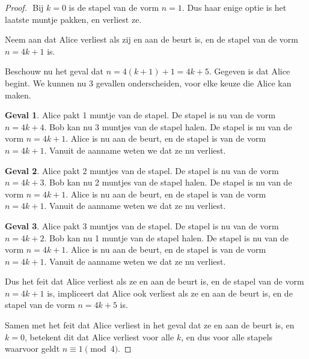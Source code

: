 \documentclass[12pt, dutch, a4paper]{article}
\theoremstyle{definition}
\newtheorem{case}{Geval}
\begin{document}
\begin{proof} $ $ \newline
  Bij $k = 0$ is de stapel van de vorm $n = 1$. 
  Dus haar enige optie is het laatste muntje pakken, en verliest ze.

  Neem aan dat Alice verliest als zij 
  en aan de beurt is, en de stapel van de vorm $n = 4k + 1$ is.

  Beschouw nu het geval dat $n = 4(k + 1) + 1 = 4k + 5$.
  Gegeven is dat Alice begint. We kunnen nu 3 gevallen onderscheiden, 
  voor elke keuze die Alice kan maken.
  \begin{case}
    Alice pakt 1 muntje van de stapel. 
    De stapel is nu van de vorm $n = 4k + 4$. 
    Bob kan nu 3 muntjes van de stapel halen. De stapel is nu van de vorm $n = 4k + 1$. 
    Alice is nu aan de beurt, en de stapel is van de vorm $n = 4k + 1$.
    Vanuit de aanname weten we dat ze nu verliest.
  \end{case}

  \begin{case}
    Alice pakt 2 muntjes van de stapel.
    De stapel is nu van de vorm $n = 4k + 3$. 
    Bob kan nu 2 muntjes van de stapel halen. De stapel is nu van de vorm $n = 4k + 1$.
    Alice is nu aan de beurt, en de stapel is van de vorm $n = 4k + 1$.
    Vanuit de aanname weten we dat ze nu verliest.
  \end{case}

  \begin{case}
    Alice pakt 3 muntjes van de stapel.
    De stapel is nu van de vorm $n = 4k + 2$. 
    Bob kan nu 1 muntje van de stapel halen. De stapel is nu van de vorm $n = 4k + 1$.
    Alice is nu aan de beurt, en de stapel is van de vorm $n = 4k + 1$.
    Vanuit de aanname weten we dat ze nu verliest.
  \end{case}

  Dus het feit dat Alice verliest als ze 
  en aan de beurt is, en de stapel van de vorm $n = 4k + 1$ is,
  impliceert dat Alice ook verliest als ze 
  en aan de beurt is, en de stapel van de vorm $n = 4k + 5$ is.

  Samen met het feit dat Alice verliest in het geval dat ze en aan de beurt is, en $k = 0$, 
  betekent dit dat Alice verliest voor alle $k$, 
  en dus voor alle stapels waarvoor geldt $n \equiv 1 \pmod{4}$. 

\end{proof} 
\end{document}

